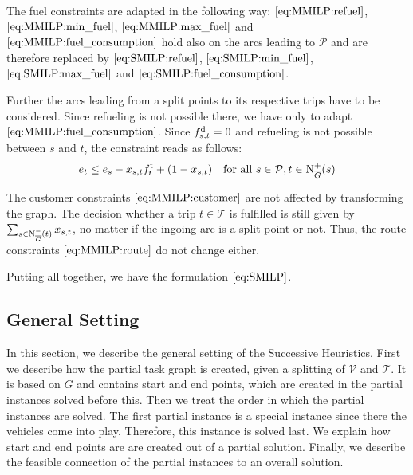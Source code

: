 The fuel constraints are adapted in the following way: $\eqref{eq:MMILP:refuel}$, $\eqref{eq:MMILP:min_fuel}$, $\eqref{eq:MMILP:max_fuel}$ and $\eqref{eq:MMILP:fuel_consumption}$ hold also on the arcs leading to $\mathcal{P}$ and are therefore replaced by $\eqref{eq:SMILP:refuel}$, $\eqref{eq:SMILP:min_fuel}$, $\eqref{eq:SMILP:max_fuel}$ and $\eqref{eq:SMILP:fuel_consumption}$.

Further the arcs leading from a split points to its respective trips have to be considered. Since refueling is not possible there, we have only to adapt $\eqref{eq:MMILP:fuel_consumption}$. Since $f^{\operatorname{d}}_{s,t} = 0$ and refueling is not possible between $s$ and $t$, the constraint reads as follows:
\begin{align}
	e_t \leq e_s - x_{s,t}f^{\operatorname{t}}_t + \left(1-x_{s,t}\right) && \text{for all } s\in \mathcal{P},t\in\operatorname{N}_{\overline{G}}^+(s) \label{eq:SMILP:fuel_splitpoint}
\end{align}

The customer constraints $\eqref{eq:MMILP:customer}$ are not affected by transforming the graph. The decision whether a trip $t\in\mathcal{T}$ is fulfilled is still given by $\sum_{s\in\operatorname{N}_{\overline{G}}^-(t)} x_{s,t}$, no matter if the ingoing arc is a split point or not. Thus, the route constraints $\eqref{eq:MMILP:route}$ do not change either.

Putting all together, we have the formulation $\eqref{eq:SMILP}$.


\subsection{General Setting}
\label{sec:general_setting}

In this section, we describe the general setting of the Successive Heuristics. First we describe how the partial task graph is created, given a splitting of $\mathcal{V}$ and $\mathcal{T}$. It is based on $\overline{G}$ and contains start and end points, which are created in the partial instances solved before this. Then we treat the order in which the partial instances are solved. The first partial instance is a special instance since there the vehicles come into play. Therefore, this instance is solved last. We explain how start and end points are are created out of a partial solution. Finally, we describe the feasible connection of the partial instances to an overall solution.

